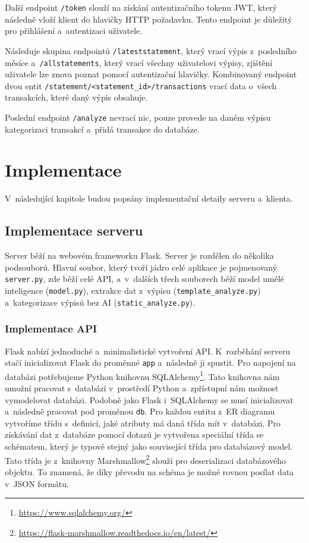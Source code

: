 Další endpoint \texttt{/token} slouží na získání autentizačního tokenu JWT, který následně vloží klient do hlavičky HTTP požadavku. Tento endpoint je důležitý pro přihlášení a~autentizaci uživatele.

Následuje skupina endpointů \texttt{/lateststatement}, který vrací výpis z~posledního měsíce a~\texttt{/allstatements}, který vrací všechny uživatelovi výpisy, zjištění uživatele lze znova poznat pomocí autentizační hlavičky.
Kombinovaný endpoint dvou entit \break \texttt{/statement/<statement\_id>/transactions} vrací data o~všech transakcích, které daný výpis obsahuje.

Poslední endpoint \texttt{/analyze} nevrací nic, pouze provede na daném výpisu kategorizaci transakcí a~přidá transakce do databáze.


\chapter{Implementace}
V~následující kapitole budou popsány implementační detaily serveru a~klienta.

\section{Implementace serveru}
Server běží na webovém frameworku Flask. Server je rozdělen do několika podsouborů. Hlavní soubor, který tvoří jádro celé aplikace je pojmenovaný \texttt{server.py}, zde běží celé API, a~v~dalších třech souborech běží model umělé inteligence (\texttt{model.py}), extrakce dat z~výpisu (\texttt{template\_analyze.py}) a~kategorizace výpisů 
 bez AI (\texttt{static\_analyze.py}).
 
\subsection{Implementace API}
Flask nabízí jednoduché a~minimalistické vytvoření API. K~rozběhání serveru stačí inicializovat Flask do proměnné \texttt{app} a~následně ji spustit. Pro napojení na databázi potřebujeme Python knihovnu SQLAlchemy\footnote{\url{https://www.sqlalchemy.org/}}. Tato knihovna nám umožní pracovat s~databází v~prostředí Python a~zpřístupní nám možnost vymodelovat databázi. Podobně jako Flask i~SQLAlchemy se musí inicializovat a~následně pracovat pod proměnou \texttt{db}. Pro každou entitu z~ER diagramu vytvoříme třídu s~definicí, jaké atributy má daná třída mít v~databázi. Pro získávání dat z~databáze pomocí dotazů je vytvořena speciální třída se schématem, který je typově stejný jako související třída pro databázový model. Tato třída je z~knihovny Marshmallow\footnote{\url{https://flask-marshmallow.readthedocs.io/en/latest/}} slouží pro deserializaci databázového objektu. To znamená, že díky převodu na schéma je možné rovnou posílat data v~JSON formátu.


